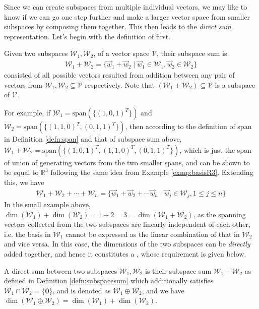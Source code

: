 Since we can create subspaces from multiple individual vectors, we may like to know if we can go one step further and make a larger vector space from smaller subspaces by composing them together. This then leads to the \textit{direct sum} representation. Let's begin with the definition of  first.
\begin{defn}
\label{defn:subspacesum}
Given two subspaces $\mathcal{W}_1, \mathcal{W}_2$, of a vector space $\mathcal{V}$, their subspace sum is
\begin{align*}
\mathcal{W}_1 + \mathcal{W}_2 = \{\vec{w}_1 + \vec{w}_2 \mid \vec{w}_1 \in \mathcal{W}_1, \vec{w}_2 \in \mathcal{W}_2\}    
\end{align*}
consisted of all possible vectors resulted from addition between any pair of vectors from $\mathcal{W}_1, \mathcal{W}_2 \subseteq \mathcal{V}$ respectively. Note that $(\mathcal{W}_1 + \mathcal{W}_2) \subseteq \mathcal{V}$ is a subspace of $\mathcal{V}$.
\end{defn}
For example, if $\mathcal{W}_1 = \text{span}(\{(1,0,1)^T\})$ and $\mathcal{W}_2 = \text{span}(\{(1,1,0)^T, (0,1,1)^T\})$, then according to the definition of span in Definition \ref{defn:span} and that of subspace sum above, $\mathcal{W}_1 + \mathcal{W}_2 = \text{span}(\{(1,0,1)^T, (1,1,0)^T, (0,1,1)^T\})$, which is just the span of union of generating vectors from the two smaller spans, and can be shown to be equal to $\mathbb{R}^3$ following the same idea from Example \ref{exmp:basisR3}. Extending this, we have
\begin{align*}
\mathcal{W}_1 + \mathcal{W}_2 + \cdots + \mathcal{W}_n = \{\vec{w}_1 + \vec{w}_2 + \cdots \vec{w}_n \mid \vec{w}_j \in \mathcal{W}_j, 1 \leq j \leq n\}    
\end{align*}
In the small example above, $\dim(\mathcal{W}_1) + \dim(\mathcal{W}_2) = 1 + 2 = 3 = \dim(\mathcal{W}_1 + \mathcal{W}_2)$, as the spanning vectors collected from the two subspaces are linearly independent of each other, i.e. the basis in $\mathcal{W}_1$ cannot be expressed as the linear combination of that in $\mathcal{W}_2$ and vice versa. In this case, the dimensions of the two subspaces can be \textit{directly} added together, and hence it constitutes a , whose requirement is given below.
\begin{defn}
\label{defn:directsum}
A direct sum between two subspaces $\mathcal{W}_1, \mathcal{W}_2$ is their subspace sum $\mathcal{W}_1 + \mathcal{W}_2$ as defined in Definition \ref{defn:subspacesum} which additionally satisfies $\mathcal{W}_1 \cap \mathcal{W}_2 = \{\textbf{0}\}$, and is denoted as $\mathcal{W}_1 \oplus \mathcal{W}_2$, and we have $\dim(\mathcal{W}_1 \oplus \mathcal{W}_2) = \dim(\mathcal{W}_1) + \dim(\mathcal{W}_2)$.
\end{defn}
